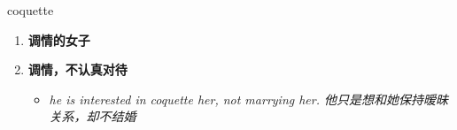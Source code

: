 
\begin{frame}
{\huge coquette}
\begin{center}
\begin{enumerate}\Large
  \item \textbf{调情的女子}
  \item \textbf{调情，不认真对待}
  \begin{itemize}
    \item \em{\Large{he is interested in coquette her, not marrying her. 他只是想和她保持暧昧关系，却不结婚}}
  \end{itemize}
\end{enumerate}
\end{center}
\end{frame}
